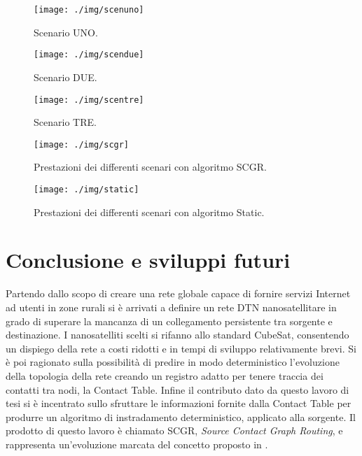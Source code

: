 \documentclass[12pt,a4paper,oneside]{book}
\begin{document}
		\begin{figure}[h]
			\centering
			\texttt{[image: ./img/scenuno]}
			\caption{Scenario UNO.}
			\label{fig:scenuno}
		\end{figure}			
		
		\begin{figure}[t]
			\centering
			\texttt{[image: ./img/scendue]}
			\caption{Scenario DUE.}
			\label{fig:scendue}
		\end{figure}	
		
		\begin{figure}[b]
			\centering
			\texttt{[image: ./img/scentre]}
			\caption{Scenario TRE.}
			\label{fig:scentre}
		\end{figure}	
		
		\begin{figure}[t]
			\centering
			\texttt{[image: ./img/scgr]}
			\caption{Prestazioni dei differenti scenari con algoritmo SCGR.}
			\label{fig:scgr}
		\end{figure}	
		
		\begin{figure}[b]
			\centering
			\texttt{[image: ./img/static]}
			\caption{Prestazioni dei differenti scenari con algoritmo Static.}
			\label{fig:static}
		\end{figure}			
		
	
	\chapter{Conclusione e sviluppi futuri}
	Partendo dallo scopo di creare una rete globale capace di fornire servizi Internet ad utenti in zone rurali si è arrivati a definire un rete DTN nanosatellitare in grado di superare la mancanza di un collegamento persistente tra sorgente e destinazione. I nanosatelliti scelti si rifanno allo standard CubeSat, consentendo un dispiego della rete a costi ridotti e in tempi di sviluppo relativamente brevi. Si è poi ragionato sulla possibilità di predire in modo deterministico l'evoluzione della topologia della rete creando un registro adatto per tenere traccia dei contatti tra nodi, la Contact Table. 
	Infine il contributo dato da questo lavoro di tesi si è incentrato sullo sfruttare le informazioni fornite dalla Contact Table per produrre un algoritmo di instradamento deterministico, applicato alla sorgente. Il prodotto di questo lavoro è chiamato SCGR, {\it Source Contact Graph Routing}, e rappresenta un'evoluzione marcata del concetto proposto in \cite{burleigh2010contact}.
	
\end{document}
